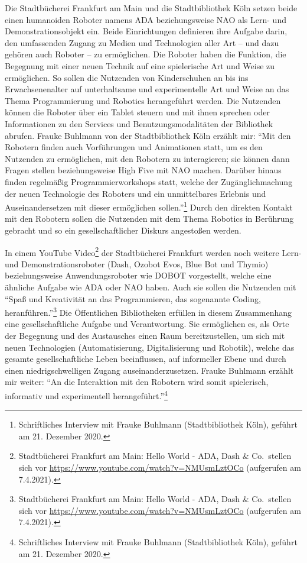 \documentclass[a4paper,
fontsize=11pt,
oneside,
numbers=noperiodatend,
parskip=half-,
bibliography=totoc,
final
]{scrartcl}
\begin{document}
Die Stadtbücherei Frankfurt am Main und die Stadtbibliothek Köln setzen
beide einen humanoiden Roboter namens ADA beziehungsweise NAO als Lern-
und Demonstrationsobjekt ein. Beide Einrichtungen definieren ihre
Aufgabe darin, den umfassenden Zugang zu Medien und Technologien aller
Art -- und dazu gehören auch Roboter -- zu ermöglichen. Die Roboter
haben die Funktion, die Begegnung mit einer neuen Technik auf eine
spielerische Art und Weise zu ermöglichen. So sollen die Nutzenden von
Kinderschuhen an bis ins Erwachsenenalter auf unterhaltsame und
experimentelle Art und Weise an das Thema Programmierung und Robotics
herangeführt werden. Die Nutzenden können die Roboter über ein Tablet
steuern und mit ihnen sprechen oder Informationen zu den Services und
Benutzungsmodalitäten der Bibliothek abrufen. Frauke Buhlmann von der
Stadtbibliothek Köln erzählt mir: \enquote{Mit den Robotern finden auch
Vorführungen und Animationen statt, um es den Nutzenden zu ermöglichen,
mit den Robotern zu interagieren; sie können dann Fragen stellen
beziehungsweise High Five mit NAO machen. Darüber hinaus finden
regelmäßig Programmierworkshops statt, welche der Zugänglichmachung der
neuen Technologie des Roboters und ein unmittelbares Erlebnis und
Auseinandersetzen mit dieser ermöglichen sollen.}\footnote{Schriftliches
  Interview mit Frauke Buhlmann (Stadtbibliothek Köln), geführt am 21.
  Dezember 2020.} Durch den direkten Kontakt mit den Robotern sollen die
Nutzenden mit dem Thema Robotics in Berührung gebracht und so ein
gesellschaftlicher Diskurs angestoßen werden.

In einem YouTube Video\footnote{Stadtbücherei Frankfurt am Main: Hello
  World - ADA, Dash \& Co.~stellen sich vor
  \url{https://www.youtube.com/watch?v=NMUsmLztOCo} (aufgerufen am
  7.4.2021).} der Stadtbücherei Frankfurt werden noch weitere Lern- und
Demonstrationsroboter (Dash, Ozobot Evos, Blue Bot und Thymio)
beziehungsweise Anwendungsroboter wie DOBOT vorgestellt, welche eine
ähnliche Aufgabe wie ADA oder NAO haben. Auch sie sollen die Nutzenden
mit \enquote{Spaß und Kreativität an das Programmieren, das sogenannte
Coding, heranführen.}\footnote{Stadtbücherei Frankfurt am Main: Hello
  World - ADA, Dash \& Co.~stellen sich vor
  \url{https://www.youtube.com/watch?v=NMUsmLztOCo} (aufgerufen am
  7.4.2021).} Die Öffentlichen Bibliotheken
erfüllen in diesem Zusammenhang eine gesellschaftliche Aufgabe und
Verantwortung. Sie ermöglichen es, als Orte der Begegnung und des
Austausches einen Raum bereitzustellen, um sich mit neuen Technologien
(Automatisierung, Digitalisierung und Robotik), welche das gesamte
gesellschaftliche Leben beeinflussen, auf informeller Ebene und durch
einen niedrigschwelligen Zugang auseinanderzusetzen. Frauke Buhlmann
erzählt mir weiter: \enquote{An die Interaktion mit den Robotern wird
somit spielerisch, informativ und experimentell
herangeführt.}\footnote{Schriftliches Interview mit Frauke Buhlmann
  (Stadtbibliothek Köln), geführt am 21. Dezember 2020.}
\end{document}
